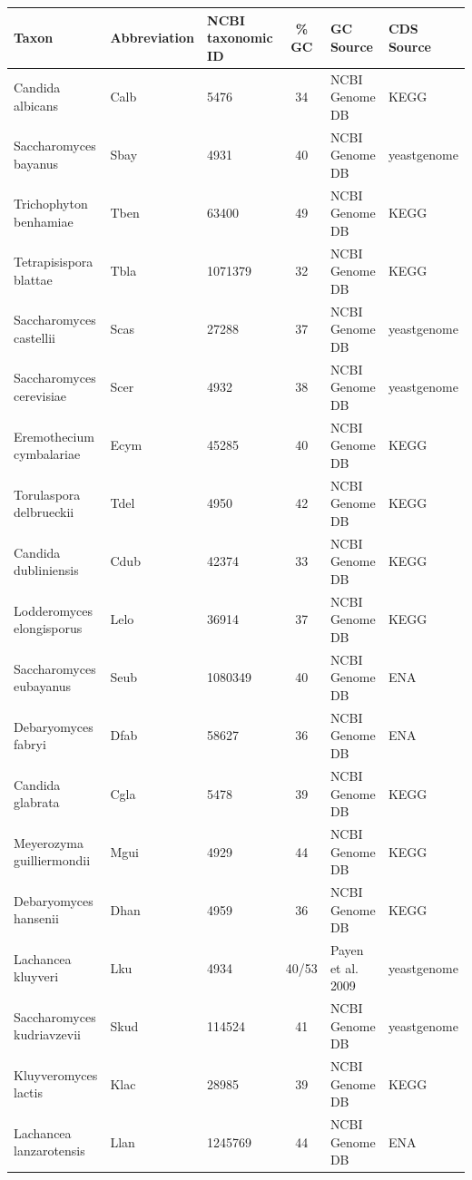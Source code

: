 \documentclass[12pt,draft]{article}
\begin{document}
\begin{table}
\begin{tabular}{ | l | l | l | c | l | l | }
\hline
	Taxon 				& Abbreviation 	& NCBI taxonomic ID 	& \% GC & GC Source  		& CDS Source \\ \hline
	Candida albicans 		& Calb 		& 5476 			& 34 	& NCBI Genome DB 	& KEGG \\ \hline
	Saccharomyces bayanus 		& Sbay 		& 4931 			& 40 	& NCBI Genome DB 	& yeastgenome \\ \hline
	Trichophyton benhamiae 		& Tben		& 63400 		& 49 	& NCBI Genome DB 	& KEGG \\ \hline
	Tetrapisispora blattae 		& Tbla 		& 1071379 		& 32 	& NCBI Genome DB 	& KEGG \\ \hline
	Saccharomyces castellii 	& Scas 		& 27288 		& 37 	& NCBI Genome DB 	& yeastgenome \\ \hline
	Saccharomyces cerevisiae 	& Scer 		& 4932 			& 38 	& NCBI Genome DB 	& yeastgenome \\ \hline
	Eremothecium cymbalariae 	& Ecym 		& 45285 		& 40 	& NCBI Genome DB 	& KEGG \\ \hline
	Torulaspora delbrueckii 	& Tdel 		& 4950 			& 42 	& NCBI Genome DB 	& KEGG \\ \hline
	Candida dubliniensis 		& Cdub 		& 42374 		& 33 	& NCBI Genome DB 	& KEGG \\ \hline
	Lodderomyces elongisporus 	& Lelo 		& 36914 		& 37 	& NCBI Genome DB 	& KEGG \\ \hline
	Saccharomyces eubayanus 	& Seub 		& 1080349 		& 40 	& NCBI Genome DB 	& ENA \\ \hline
	Debaryomyces fabryi 		& Dfab 		& 58627 		& 36 	& NCBI Genome DB 	& ENA \\ \hline
	Candida glabrata 		& Cgla 		& 5478 			& 39 	& NCBI Genome DB 	& KEGG \\ \hline
	Meyerozyma guilliermondii 	& Mgui 		& 4929 			& 44 	& NCBI Genome DB 	& KEGG \\ \hline
	Debaryomyces hansenii 		& Dhan 		& 4959 			& 36 	& NCBI Genome DB 	& KEGG \\ \hline
	Lachancea kluyveri 		& Lku 		& 4934 			& 40/53 & Payen et al. 2009 	& yeastgenome \\ \hline
	Saccharomyces kudriavzevii 	& Skud 		& 114524 		& 41 	& NCBI Genome DB 	& yeastgenome \\ \hline
	Kluyveromyces lactis 		& Klac 		& 28985 		& 39 	& NCBI Genome DB 	& KEGG \\ \hline
	Lachancea lanzarotensis 	& Llan 		& 1245769 		& 44 	& NCBI Genome DB 	& ENA \\ \hline

\end{tabular}
\end{table}
\end{document}
